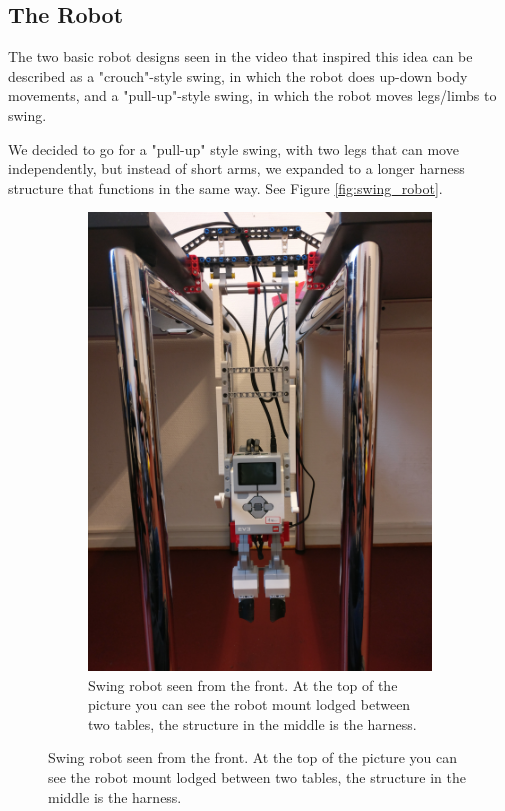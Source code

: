 \documentclass[11pt, a4paper]{article}
\begin{document}
\subsection{The Robot}
The two basic robot designs seen in the video that inspired this idea\cite{youtube_swing} can be described as a "crouch"-style swing, in which the robot does up-down body movements, and a "pull-up"-style swing, in which the robot moves legs/limbs to swing.

We decided to go for a "pull-up" style swing, with two legs that can move independently, but instead of short arms, we expanded to a longer harness structure that functions in the same way. See Figure \ref{fig:swing_robot}.

\begin{figure}[H]
	\centering
	\begin{subfigure}{.48\textwidth}
		\centering
		\includegraphics[width=1\linewidth]{images/swing_robot_front_full}
		\caption{Swing robot seen from the front. At the top of the picture you can see the robot mount lodged between two tables, the structure in the middle is the harness.}

\end{subfigure}
\end{figure}
\end{document}
